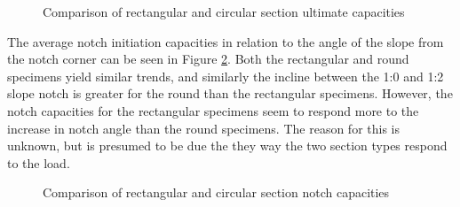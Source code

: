 \documentclass[11pt,a4paper]{article}
\numberwithin{equation}{subsection}
\begin{document}
\vspace*{\baselineskip}

\begin{figure}[h]
	\begin{center}
	\end{center}
	\caption{Comparison of rectangular and circular section ultimate capacities}
	\label{fig:compare_cap}
\end{figure}

\noindent
The average notch initiation capacities in relation to the angle of the slope from the notch corner can be seen in Figure \ref{fig:compare_not}. Both the rectangular and round specimens yield similar trends, and similarly the incline between the 1:0 and 1:2 slope notch is greater for the round than the rectangular specimens. However, the notch capacities for the rectangular specimens seem to respond more to the increase in notch angle than the round specimens. The reason for this is unknown, but is presumed to be due the they way the two section types respond to the load.

\vspace*{\baselineskip}

\begin{figure}[h]
	\begin{center}
	\end{center}
	\caption{Comparison of rectangular and circular section notch capacities}
	\label{fig:compare_not}
\end{figure}
\end{document}
